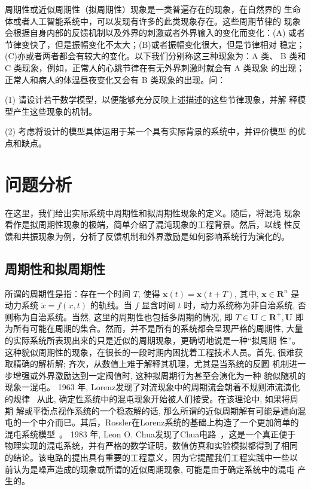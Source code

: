 \documentclass[withoutpreface,bwprint]{cumcmthesis} %
\begin{document}
周期性或近似周期性（拟周期性）现象是一类普遍存在的现象，在自然界的
生命体或者人工智能系统中，可以发现有许多的此类现象存在。这些周期节律的
现象会根据自身内部的反馈机制以及外界的刺激或者外界输入的变化而变化：(A)
或者节律变快了，但是振幅变化不太大；(B)或者振幅变化很大，但是节律相对
稳定；(C)亦或者两者都会有较大的变化。以下我们分别称这三种现象为：A 类、
B 类和 C 类现象，例如，正常人的心跳节律在有无外界刺激时就会有 A 类现象
的出现；正常人和病人的体温昼夜变化又会有 B 类现象的出现。问：

 (1) 请设计若干数学模型，以便能够充分反映上述描述的这些节律现象，并解
释模型产生这些现象的机制。

 (2) 考虑将设计的模型具体运用于某一个具有实际背景的系统中，并评价模型
的优点和缺点。

\section{问题分析}
\label{sec2}

在这里，我们给出实际系统中周期性和拟周期性现象的定义。随后，将混沌
现象看作是拟周期性现象的极端，简单介绍了混沌现象的工程背景。然后，以线
性反馈和共振现象为例，分析了反馈机制和外界激励是如何影响系统行为演化的。

\subsection{周期性和拟周期性}
\label{sec2-1}

所谓的周期性是指：存在一个时间 $T$, 使得  $\boldsymbol{x}(t)=\boldsymbol{x}(t+T) $, 其中,  $\boldsymbol{x} \in \boldsymbol{R}^{n} $ 是
动力系统 $ \dot{x}=f(x, t) $ 的轨线。当 $ f $ 显含时间 $ t$  时，动力系统称为非自治系统, 否 则称为自治系统。当然, 这里的周期性也包括多周期的情况, 即 $ T \in \boldsymbol{U} \subset \boldsymbol{R}^{+}, \boldsymbol{U} $
即为所有可能在周期的集合。然而，并不是所有的系统都会呈现严格的周期性, 大量的实际系统所表现出来的只是近似的周期现象，更确切地说是一种“拟周期 性”。这种貌似周期性的现象，在很长的一段时期内困扰着工程技术人员。首先, 很难获取精确的解析解; 齐次，从数值上难于解释其机理，尤其是当系统的反圆 机制进一步增强或外界激励达到一定阀值时, 这种拟周期行为甚至会演化为一种 貌似随机的现象一混屯。 1963 年, Lorenz发现了对流现象中的周期流会朝着不规则沛流演化的规律~ 从此, 确定性系统中的混屯现象开始被人们接受。在该理论中, 如果将周期 解或平衡点视作系统的一个稳态解的话, 那么所谓的近似周期解有可能是通向混 屯的一个中介而已。其后，Rossler在Lorenz系统的基础上构造了一个更加简单的 混屯系统模型~。 1983 年, Leon O. Chua发现了Chua电路~，这是一个真正便于 物理实现的混屯系统，并有严格的数学证明，数值仿真和实验模拟都得到了相同 的结论。该电路的提出具有重要的工程意义，因为它提醒我们工程实践中一些以 前认为是噪声造成的现象或所谓的近似周期现象, 可能是由于确定系统中的混屯 产生的。
\end{document}
